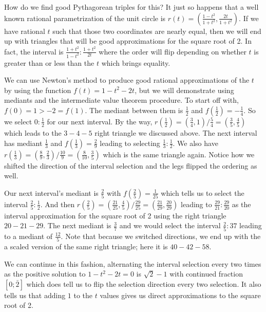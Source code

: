 \documentclass[12pt]{article}
\theoremstyle{remark}
\begin{document}
How do we find good Pythagorean triples for this? It just so happens that a well known rational parametrization of the unit circle is  $r(t) = (\frac{1-t^2}{1+t^2}, \frac{2t}{1+t^2})$.  If we have rational $t$ such that those two coordinates are nearly equal, then we will end up with triangles that will be good approximations for the square root of 2. In fact, the interval is $\frac{1+t^2}{1-t^2}:\frac{1+t^2}{2t}$ where the order will flip depending on whether $t$ is greater than or less than the $t$ which brings equality. 

We can use Newton's method to produce good rational approximations of the $t$ by using the function $f(t) = 1-t^2 - 2t$, but we will demonstrate using mediants and the intermediate value theorem procedure. To start off with, $f(0) = 1 > -2 = f(1)$. The mediant between them is $\frac{1}{2}$ and $f(\frac{1}{2}) = -\frac{1}{4}$. So we select $0:\frac{1}{2}$ for our next interval. By the way, $r(\frac{1}{2}) = (\frac{3}{4}, 1) / \frac{5}{4} = (\frac{3}{5}, \frac{4}{5})$ which leads to the $3-4-5$ right triangle we discussed above.  The next interval has mediant $\frac{1}{3}$ and $f(\frac{1}{3}) = \frac{2}{9}$ leading to selecting $\frac{1}{3}:\frac{1}{2}$. We also have $r(\frac{1}{3}) = ( \frac{8}{9}, \frac{2}{3}) / \frac{10}{9} = (\frac{8}{10}, \frac{3}{5})$ which is the same triangle again. Notice how we shifted the direction of the interval selection and the legs flipped the ordering as well.

Our next interval's mediant is $\frac{2}{5}$ with $f(\frac{2}{5}) = \frac{1}{25}$ which tells us to select the interval $\frac{2}{5}:\frac{1}{2}$. And then $r(\frac{2}{5}) = (\frac{21}{25}, \frac{4}{5})/\frac{29}{25} = (\frac{21}{29}, \frac{20}{29})$ leading to $\frac{29}{21}:\frac{29}{20}$ as the interval approximation for the square root of 2 using the right triangle $20-21-29$. The next mediant is $\frac{3}{7}$ and we would select the interval $\frac{2}{5}:{3}{7}$ leading to a mediant of $\frac{12}{5}$.  Note that because we switched directions, we end up with the a scaled version of the same right triangle; here it is $40-42-58$. 

We can continue in this fashion, alternating the interval selection every two times as the positive solution to $1 - t^2 - 2t = 0$ is $\sqrt{2}-1$ with continued fraction $[0;\bar{2}]$ which does tell us to flip the selection direction every two selection. It also tells us that adding $1$ to the $t$ values gives us direct approximations to the square root of 2. 
\end{document}
